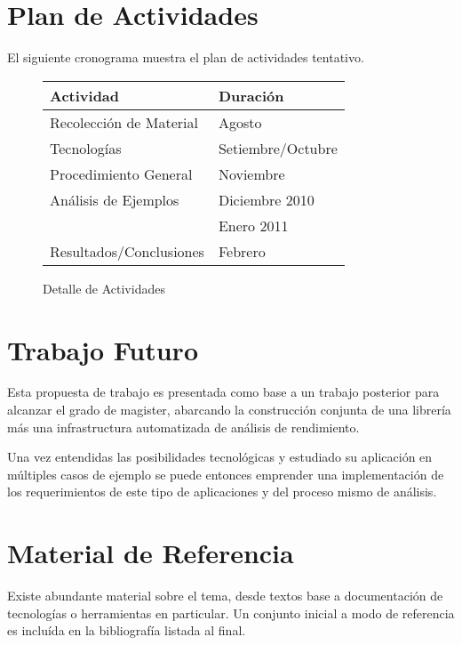 \documentclass[a4paper,twocolumn]{article}
\begin{document}
\section{Plan de Actividades}

El siguiente cronograma muestra el plan de actividades tentativo.

\begin{figure}[H]
  \begin{center}
    \begin{tabular}{|l|l|}\hline
      {\bf Actividad} & {\bf Duraci\'on} \\ \hline
      Recolecci\'on de Material & Agosto \\ \hline
      Tecnolog\'ias & Setiembre/Octubre \\ \hline
      Procedimiento General & Noviembre \\ \hline
      An\'alisis de Ejemplos & Diciembre 2010 \\ & Enero 2011 \\ \hline
      Resultados/Conclusiones & Febrero \\ \hline
    \end{tabular}
    \caption{Detalle de Actividades}
  \end{center}
  \label{schedule}
\end{figure}

\section{Trabajo Futuro}

Esta propuesta de trabajo es presentada como base a un trabajo posterior para alcanzar el grado de magister,
abarcando la construcci\'on conjunta de una librer\'ia m\'as una infrastructura automatizada de an\'alisis de rendimiento.

\smallskip

Una vez entendidas las posibilidades tecnol\'ogicas y estudiado su aplicaci\'on en
m\'ultiples casos de ejemplo se puede entonces emprender una implementaci\'on de los
requerimientos de este tipo de aplicaciones y del proceso mismo de an\'alisis.

\section{Material de Referencia}

Existe abundante material sobre el tema, desde textos base a documentaci\'on de tecnolog\'ias
o herramientas en particular. Un conjunto inicial a modo de referencia es
inclu\'ida en la bibliograf\'ia listada al final.
\end{document}
